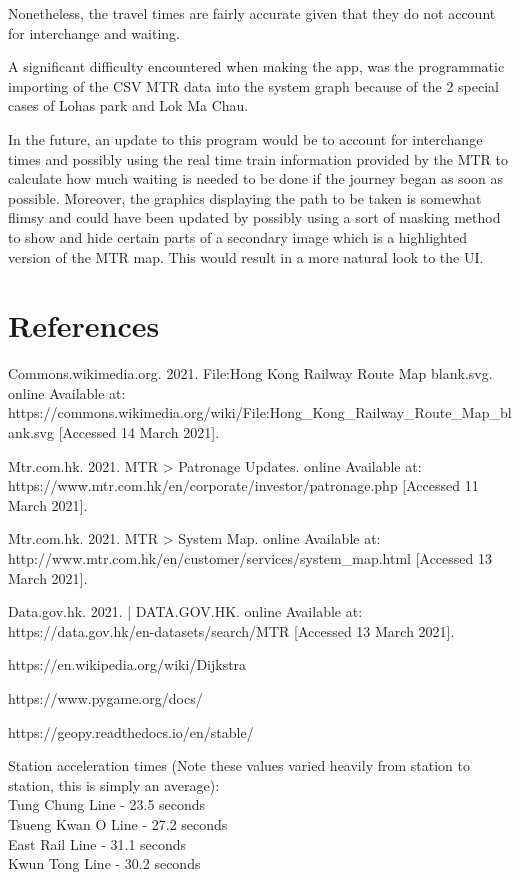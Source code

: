 \documentclass[fontsize=11pt]{article}
\begin{document}
Nonetheless, the travel times are fairly accurate given that they do not account for interchange and waiting.

A significant difficulty encountered when making the app, was the programmatic importing of the CSV MTR data into the system graph because of the 2 special cases of Lohas park and Lok Ma Chau. 

In the future, an update to this program would be to account for interchange times and possibly using the real time train information provided by the MTR to calculate how much waiting is needed to be done if the journey began as soon as possible. Moreover, the graphics displaying the path to be taken is somewhat flimsy and could have been updated by possibly using a sort of masking method to show and hide certain parts of a secondary image which is a highlighted version of the MTR map. This would result in a more natural look to the UI.

\section*{References}

Commons.wikimedia.org. 2021. File:Hong Kong Railway Route Map blank.svg. online Available at:\\ https://commons.wikimedia.org/wiki/File:Hong\_Kong\_Railway\_Route\_Map\_blank.svg [Accessed 14 March 2021].

Mtr.com.hk. 2021. MTR > Patronage Updates. online Available at:\\ https://www.mtr.com.hk/en/corporate/investor/patronage.php [Accessed 11 March 2021].

Mtr.com.hk. 2021. MTR > System Map. online Available at:\\ http://www.mtr.com.hk/en/customer/services/system\_map.html [Accessed 13 March 2021].

Data.gov.hk. 2021. | DATA.GOV.HK. online Available at: \\
https://data.gov.hk/en-datasets/search/MTR [Accessed 13 March 2021].

https://en.wikipedia.org/wiki/Dijkstra%

https://www.pygame.org/docs/

https://geopy.readthedocs.io/en/stable/

Station acceleration times (Note these values varied heavily from station to station, this is simply an average): \\
Tung Chung Line - 23.5 seconds\\
Tsueng Kwan O Line - 27.2 seconds\\
East Rail Line - 31.1 seconds\\
Kwun Tong Line - 30.2 seconds\\
\end{document}
